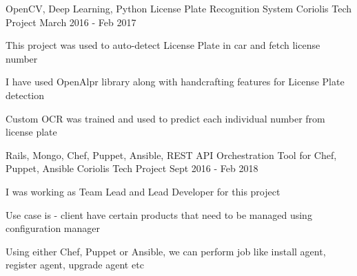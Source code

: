 \begin{cventries}
   \cventry
    {OpenCV, Deep Learning, Python} %
    {License Plate Recognition System} %
    {Coriolis Tech Project} %
    {March 2016 - Feb 2017} %
    {
      \begin{cvitems} %
        \item {This project was used to auto-detect License Plate in car and fetch license number}
        \item {I have used OpenAlpr library along with handcrafting features for License Plate detection}
        \item {Custom OCR was trained and used to predict each individual number from license plate}
      \end{cvitems}
    }

  \cventry
    {Rails, Mongo, Chef, Puppet, Ansible, REST API} %
    {Orchestration Tool for Chef, Puppet, Ansible} %
    {Coriolis Tech Project} %
    {Sept 2016 - Feb 2018} %
    {
      \begin{cvitems} %
        \item {I was working as Team Lead and Lead Developer for this project}
        \item {Use case is - client have certain products that need to be managed using configuration manager}
        \item {Using either Chef, Puppet or Ansible, we can perform job like install agent, register agent, upgrade agent etc}
      \end{cvitems}
    }



\end{cventries}
